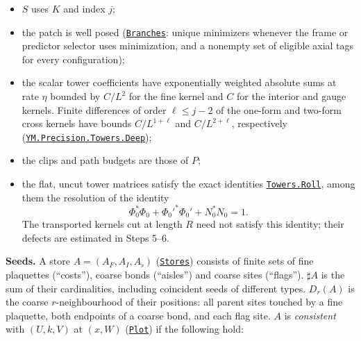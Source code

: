 \documentclass[
  letterpaper,
  11pt]{article}
\newcounter{none} %
\providecommand{\tightlist}{%
  \setlength{\itemsep}{0pt}\setlength{\parskip}{0pt}}
\begin{document}
\begin{itemize}
  \begin{itemize}
  \tightlist
  \item
    \(S\) uses \(K\) and index \(j\);
  \item
    the patch is well posed
    (\href{https://github.com/yang-mills-group/OpenAI-YM-20261028/blob/3456e5e75cf8d4cd558955a5c7638fba2d68f464/YM/RG/Patch.lean\#L182-L185}{\texttt{Branches}}:
    unique minimizers whenever the frame or predictor selector uses
    minimization, and a nonempty set of eligible axial tags for every
    configuration);
  \item
    the scalar tower coefficients have exponentially weighted absolute
    sums at rate \(\eta\) bounded by \(C/L^2\) for the fine kernel and
    \(C\) for the interior and gauge kernels. Finite differences of
    order \(\ell\le j-2\) of the one-form and two-form cross kernels
    have bounds \(C/L^{1+\ell}\) and \(C/L^{2+\ell}\), respectively
    (\href{https://github.com/yang-mills-group/OpenAI-YM-20261028/blob/3456e5e75cf8d4cd558955a5c7638fba2d68f464/YM/PREC/Stacks.lean\#L111-L114}{\texttt{YM.Precision.Towers.Deep}});
  \item
    the clips and path budgets are those of \(P\);
  \item
    the flat, uncut tower matrices satisfy the exact identities
    \href{https://github.com/yang-mills-group/OpenAI-YM-20261028/blob/3456e5e75cf8d4cd558955a5c7638fba2d68f464/YM/PREC/Stacks.lean\#L88-L96}{\texttt{Towers.Roll}},
    among them the resolution of the identity
    \[\Phi_0^*\Phi_0+\Phi_0'^*\Phi_0'+N_0^*N_0=1.\] The transported
    kernels cut at length \(R\) need not satisfy this identity; their
    defects are estimated in Steps 5--6.
  \end{itemize}
\end{itemize}

\textbf{Seeds.} A store \(A=(A_F,A_I,A_\flat)\)
(\href{https://github.com/yang-mills-group/OpenAI-YM-20261028/blob/3456e5e75cf8d4cd558955a5c7638fba2d68f464/YM/Pressure/Seeds.lean\#L34-L37}{\texttt{Stores}})
consists of finite sets of fine plaquettes (``costs''), coarse bonds
(``aisles'') and coarse sites (``flags''). \(\sharp A\) is the sum of
their cardinalities, including coincident seeds of different types.
\(D_r(A)\) is the coarse \(r\)-neighbourhood of their positions: all
parent sites touched by a fine plaquette, both endpoints of a coarse
bond, and each flag site. \(A\) is \emph{consistent} with \((U,k,V)\) at
\((x,W)\)
(\href{https://github.com/yang-mills-group/OpenAI-YM-20261028/blob/3456e5e75cf8d4cd558955a5c7638fba2d68f464/YM/Pressure/Seeds.lean\#L51-L58}{\texttt{Plot}})
if the following hold:
\end{document}
